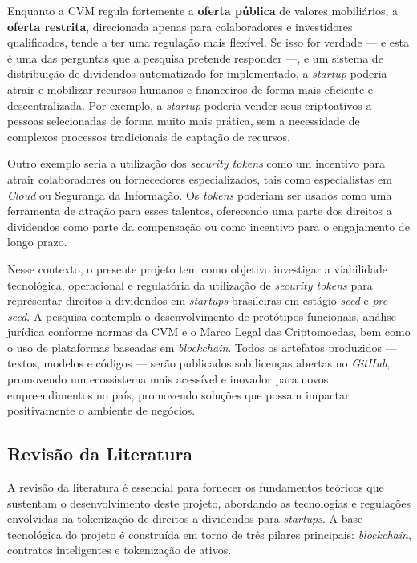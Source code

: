 \documentclass[12pt, a4paper, oneside, openright, chapter=TITLE]{abntex2}
\begin{document}
Enquanto a CVM regula fortemente a \textbf{oferta pública} de valores mobiliários, a \textbf{oferta restrita}, direcionada apenas para colaboradores e investidores qualificados, tende a ter uma regulação mais flexível. Se isso for verdade — e esta é uma das perguntas que a pesquisa pretende responder —, e um sistema de distribuição de dividendos automatizado for implementado, a \textit{startup} poderia atrair e mobilizar recursos humanos e financeiros de forma mais eficiente e descentralizada. Por exemplo, a \textit{startup} poderia vender seus criptoativos a pessoas selecionadas de forma muito mais prática, sem a necessidade de complexos processos tradicionais de captação de recursos.

Outro exemplo seria a utilização dos \textit{security tokens} como um incentivo para atrair colaboradores ou fornecedores especializados, tais como especialistas em \textit{Cloud} ou Segurança da Informação. Os \textit{tokens} poderiam ser usados como uma ferramenta de atração para esses talentos, oferecendo uma parte dos direitos a dividendos como parte da compensação ou como incentivo para o engajamento de longo prazo.

Nesse contexto, o presente projeto tem como objetivo investigar a viabilidade tecnológica, operacional e regulatória da utilização de \textit{security tokens} para representar direitos a dividendos em \textit{startups} brasileiras em estágio \textit{seed} e \textit{pre-seed}. A pesquisa contempla o desenvolvimento de protótipos funcionais, análise jurídica conforme normas da CVM e o Marco Legal das Criptomoedas, bem como o uso de plataformas baseadas em \textit{blockchain}. Todos os artefatos produzidos — textos, modelos e códigos — serão publicados sob licenças abertas no \textit{GitHub}, promovendo um ecossistema mais acessível e inovador para novos empreendimentos no país, promovendo soluções que possam impactar positivamente o ambiente de negócios.

\subsection{Revisão da Literatura}

\hspace*{\parindent} A revisão da literatura é essencial para fornecer os fundamentos teóricos que sustentam o desenvolvimento deste projeto, abordando as tecnologias e regulações envolvidas na tokenização de direitos a dividendos para \textit{startups}. A base tecnológica do projeto é construída em torno de três pilares principais: \textit{blockchain}, contratos inteligentes e tokenização de ativos.
\end{document}
